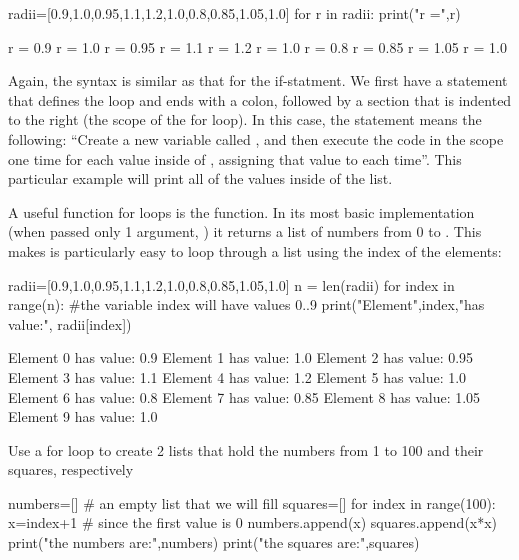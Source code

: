 \begin{python}[caption = For in loops]
radii=[0.9,1.0,0.95,1.1,1.2,1.0,0.8,0.85,1.05,1.0]
for r in radii:
  print("r =",r)
\end{python}
\begin{poutput}
r = 0.9
r = 1.0
r = 0.95
r = 1.1
r = 1.2
r = 1.0
r = 0.8
r = 0.85
r = 1.05
r = 1.0
\end{poutput}

Again, the syntax is similar as that for the if-statment. We first have a statement that defines the loop and ends with a colon, followed by a section that is indented to the right (the scope of the for loop). In this case, the  statement means the following: ``Create a new variable called , and then execute the code in the scope one time for each value inside of , assigning that value to  each time''. This particular example will print all of the values inside of the list.

A useful function for loops is the  function. In its most basic implementation (when passed only 1 argument, ) it returns a list of numbers from 0 to . This makes is particularly easy to loop through a list using the index of the elements:

\begin{python}[caption = For loop with range]
radii=[0.9,1.0,0.95,1.1,1.2,1.0,0.8,0.85,1.05,1.0]
n = len(radii)
for index in range(n):
  #the variable index will have values 0..9
  print("Element",index,"has value:", radii[index])
\end{python}
\begin{poutput}
Element 0 has value: 0.9
Element 1 has value: 1.0
Element 2 has value: 0.95
Element 3 has value: 1.1
Element 4 has value: 1.2
Element 5 has value: 1.0
Element 6 has value: 0.8
Element 7 has value: 0.85
Element 8 has value: 1.05
Element 9 has value: 1.0
\end{poutput}

\begin{example}{Use a for loop to create 2 lists that hold the numbers from 1 to 100 and their squares, respectively}{}
\begin{python}[caption = Loop example]
numbers=[] # an empty list that we will fill
squares=[]
for index in range(100):
  x=index+1 # since the first value is 0
  numbers.append(x)
  squares.append(x*x)
print("the numbers are:",numbers)
print("the squares are:",squares)
\end{python}
\end{example}
